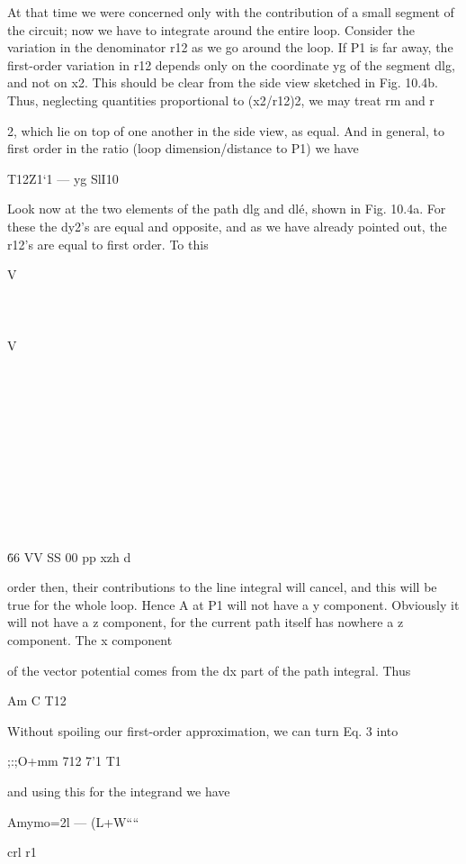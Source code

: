 At that time we were concerned only with the contribution of a small
segment of the circuit; now we have to integrate around the entire
loop. Consider the variation in the denominator r12 as we go around
the loop. If P1 is far away, the first-order variation in r12 depends
only on the coordinate yg of the segment dlg, and not on x2. This
should be clear from the side view sketched in Fig. 10.4b. Thus,
neglecting quantities proportional to (x2/r12)2, we may treat rm
and r{2, which lie on top of one another in the side view, as equal.
And in general, to first order in the ratio (loop dimension/distance
to P1) we have

T12Z1‘1  ---  yg SlI10 

Look now at the two elements of the path dlg and dlé, shown in
Fig. 10.4a. For these the dy2's are equal and opposite, and as we
have already pointed out, the r12's are equal to first order. To this

V\\\\\\\\\§
V\\\\\\\\\\\\\\\\\\\\\\\\\.

66
VV
SS
00
pp
xzh
d

order then, their contributions to the line integral will cancel, and
this will be true for the whole loop. Hence A at P1 will not have a
y component. Obviously it will not have a z component, for the
current path itself has nowhere a z component. The x component

of the vector potential comes from the dx part of the path integral.
Thus

Am%
C T12

Without spoiling our first-order approximation, we can turn Eq. 3
into

;:;O+mm%
712 7'1 T1

and using this for the integrand we have

Amymo=2l --- (L+W````%

crl r1

}
